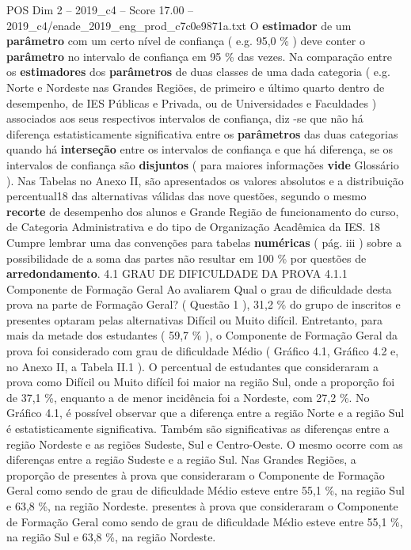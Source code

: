 \begin{textsample}{POS Dim 2 – 2019\_c4 – Score 17.00 – 2019\_c4/enade\_2019\_eng\_prod\_c7c0e9871a.txt}
O \textbf{estimador} de um \textbf{parâmetro} com um certo nível de confiança ( e.g. 95,0 \% ) deve conter o \textbf{parâmetro} no intervalo de confiança em 95 \% das vezes.
Na comparação entre os \textbf{estimadores} dos \textbf{parâmetros} de duas classes de uma dada categoria ( e.g.
Norte e Nordeste nas Grandes Regiões, de primeiro e último quarto dentro de desempenho, de IES Públicas e Privada, ou de Universidades e Faculdades ) associados aos seus respectivos intervalos de confiança, diz -se que não há diferença estatisticamente significativa entre os \textbf{parâmetros} das duas categorias quando há \textbf{interseção} entre os intervalos de confiança e que há diferença, se os intervalos de confiança são \textbf{disjuntos} ( para maiores informações \textbf{vide} Glossário ).
Nas Tabelas no Anexo II, são apresentados os valores absolutos e a distribuição percentual18 das alternativas válidas das nove questões, segundo o mesmo \textbf{recorte} de desempenho dos alunos e Grande Região de funcionamento do curso, de Categoria Administrativa e do tipo de Organização Acadêmica da IES. 18 Cumpre lembrar uma das convenções para tabelas \textbf{numéricas} ( pág. iii ) sobre a possibilidade de a soma das partes não resultar em 100 \% por questões de \textbf{arredondamento}. 4.1 GRAU DE DIFICULDADE DA PROVA 4.1.1 Componente de Formação Geral Ao avaliarem Qual o grau de dificuldade desta prova na parte de Formação Geral? ( Questão 1 ), 31,2 \% do grupo de inscritos e presentes optaram pelas alternativas Difícil ou Muito difícil.
Entretanto, para mais da metade dos estudantes ( 59,7 \% ), o Componente de Formação Geral da prova foi considerado com grau de dificuldade Médio ( Gráfico 4.1, Gráfico 4.2 e, no Anexo II, a Tabela II.1 ).
O percentual de estudantes que consideraram a prova como Difícil ou Muito difícil foi maior na região Sul, onde a proporção foi de 37,1 \%, enquanto a de menor incidência foi a Nordeste, com 27,2 \%.
No Gráfico 4.1, é possível observar que a diferença entre a região Norte e a região Sul é estatisticamente significativa.
Também são significativas as diferenças entre a região Nordeste e as regiões Sudeste, Sul e Centro-Oeste.
O mesmo ocorre com as diferenças entre a região Sudeste e a região Sul.
Nas Grandes Regiões, a proporção de presentes à prova que consideraram o Componente de Formação Geral como sendo de grau de dificuldade Médio esteve entre 55,1 \%, na região Sul e 63,8 \%, na região Nordeste. presentes à prova que consideraram o Componente de Formação Geral como sendo de grau de dificuldade Médio esteve entre 55,1 \%, na região Sul e 63,8 \%, na região Nordeste.

\end{textsample}
